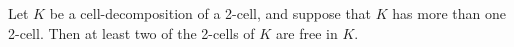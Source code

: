 Let $K$ be a cell-decomposition of a 2-cell, and suppose that $K$ has more than one 2-cell. Then at least two of the 2-cells of $K$ are free in $K$.
